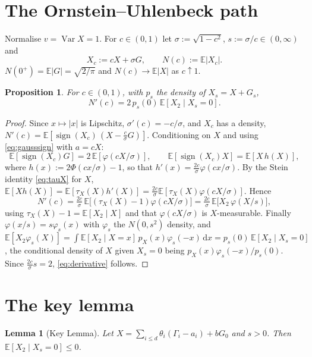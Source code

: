 \documentclass[11pt]{article}
\newtheorem{lemma}[theorem]{Lemma}
\newtheorem{proposition}[theorem]{Proposition}
\theoremstyle{remark}
\newcommand{\E}{\mathbb{E}}
\newcommand{\sgn}{\operatorname{sign}}
\newcommand{\Var}{\operatorname{Var}}
\newcommand{\dd}{\,\mathrm{d}}
\begin{document}
\section{The Ornstein--Uhlenbeck path}\label{sec:OU}

Normalise $v=\Var X=1$. For $c\in(0,1)$ let $\sigma:=\sqrt{1-c^2}$, $s:=\sigma/c\in(0,\infty)$ and
\[
X_c:=cX+\sigma G,\qquad N(c):=\E|X_c| .
\]
$N(0^+)=\E|G|=\sqrt{2/\pi}$ and $N(c)\to\E|X|$ as $c\uparrow1$.

\begin{proposition}\label{prop:derivative}
For $c\in(0,1)$, with $p_s$ the density of $X_s=X+G_s$,
\begin{equation}\label{eq:derivative}
N'(c)=2\,p_s(0)\,\E[X_2\mid X_s=0] .
\end{equation}
\end{proposition}
\begin{proof}
Since $x\mapsto|x|$ is Lipschitz, $\sigma'(c)=-c/\sigma$, and $X_c$ has a density, $N'(c)=\E[\sgn(X_c)\,(X-\tfrac c\sigma G)]$.
Conditioning on $X$ and using \eqref{eq:gausssign} with $a=cX$:
\[
\E[\sgn(X_c)G]=2\,\E[\varphi(cX/\sigma)],\qquad \E[\sgn(X_c)X]=\E[X\,h(X)],
\]
where $h(x):=2\Phi(cx/\sigma)-1$, so that $h'(x)=\tfrac{2c}{\sigma}\varphi(cx/\sigma)$.
By the Stein identity \eqref{eq:tauX} for $X$, $\E[Xh(X)]=\E[\tau_X(X)h'(X)]=\tfrac{2c}\sigma\E[\tau_X(X)\varphi(cX/\sigma)]$. Hence
\[
N'(c)=\tfrac{2c}{\sigma}\,\E\big[(\tau_X(X)-1)\varphi(cX/\sigma)\big]=\tfrac{2c}{\sigma}\,\E\big[X_2\,\varphi(X/s)\big],
\]
using $\tau_X(X)-1=\E[X_2\mid X]$ and that $\varphi(cX/\sigma)$ is $X$-measurable. Finally $\varphi(x/s)=s\varphi_s(x)$ with $\varphi_s$
the $N(0,s^2)$ density, and $\E[X_2\varphi_s(X)]=\int\E[X_2\mid X=x]\,p_X(x)\varphi_s(-x)\dd x=p_s(0)\,\E[X_2\mid X_s=0]$, the conditional
density of $X$ given $X_s=0$ being $p_X(x)\varphi_s(-x)/p_s(0)$. Since $\tfrac{2c}{\sigma}s=2$, \eqref{eq:derivative} follows.
\end{proof}

\section{The key lemma}\label{sec:key}

\begin{lemma}[Key Lemma]\label{lem:key}
Let $X=\sum_{i\le d}\theta_i(\Gamma_i-a_i)+bG_0$ and $s>0$. Then $\E[X_2\mid X_s=0]\le0$.
\end{lemma}
\end{document}
